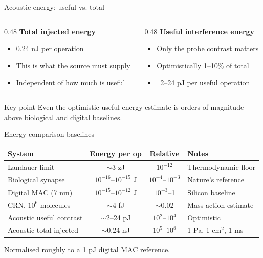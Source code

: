 \documentclass[aspectratio=169,11pt]{beamer}
\begin{document}
\begin{frame}{Acoustic energy: useful vs. total}
  \small
  \begin{columns}[T]
    \begin{column}{0.48\textwidth}
      \textbf{Total injected energy}
      \begin{itemize}
        \item 0.24 nJ per operation
        \item This is what the source must supply
        \item Independent of how much is useful
      \end{itemize}
    \end{column}
    \begin{column}{0.48\textwidth}
      \textbf{Useful interference energy}
      \begin{itemize}
        \item Only the probe contrast matters
        \item Optimistically 1--10\% of total
        \item ~2--24 pJ per useful operation
      \end{itemize}
    \end{column}
  \end{columns}

  \vspace{0.4cm}
  \begin{block}{Key point}
    Even the optimistic useful-energy estimate is orders of magnitude above biological and digital baselines.
  \end{block}
\end{frame}

\begin{frame}{Energy comparison baselines}
  \small
  \begin{center}
    \footnotesize
    \begin{tabular}{lccl}
      \toprule
      System & Energy per op & Relative & Notes \\
      \midrule
      Landauer limit & $\sim$3 zJ & $10^{-12}$ & Thermodynamic floor \\
      Biological synapse & $10^{-16}$--$10^{-15}$ J & $10^{-4}$--$10^{-3}$ & Nature's reference \\
      Digital MAC (7 nm) & $10^{-15}$--$10^{-12}$ J & $10^{-3}$--1 & Silicon baseline \\
      CRN, $10^6$ molecules & $\sim$4 fJ & $\sim$0.02 & Mass-action estimate \\
      Acoustic useful contrast & $\sim$2--24 pJ & $10^2$--$10^4$ & Optimistic \\
      Acoustic total injected & $\sim$0.24 nJ & $10^5$--$10^8$ & 1 Pa, 1 cm$^2$, 1 ms \\
      \bottomrule
    \end{tabular}
  \end{center}

  \vspace{0.2cm}
  \textcolor{gdpSlate}{\footnotesize Normalised roughly to a 1 pJ digital MAC reference.}
\end{frame}
\end{document}

